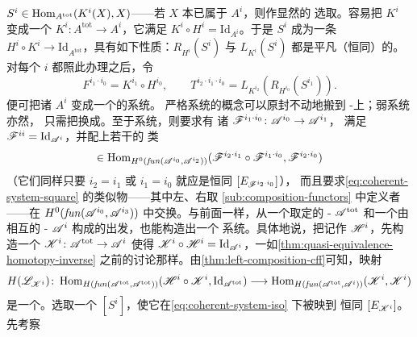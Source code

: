 $S^i\in\operatorname{Hom}_{A^{\mathrm{tot}}}(K^i(X),X)$——若 $X$ 本已属于 $A^i$，则作显然的%
选取。容易把 $K^i$ 变成一个\trFunctor{} $K^i\colon A^{\mathrm{tot}}\to A^i$，它满足%
$K^i\circ H^i=\mathrm{Id}_{A^i}$。于是 $S^i$ 成为一条\trNaturalTransformation{}
$H^i\circ K^i\to\mathrm{Id}_{A^{\mathrm{tot}}}$，具有如下性质：$R_{H^i}(S^i)$ 与%
$L_{K^i}(S^i)$ 都是平凡（恒同）的\trNaturalTransformation。对每个 $i$ 都照此办理之后，令
\begin{equation*}
F^{i_1\cdot i_0}=K^{i_1}\circ H^{i_0},\qquad
T^{i_2\cdot i_1\cdot i_0}=L_{K^{i_2}}(R_{H^{i_0}}(S^{i_1})).
\end{equation*}
便可把诸 $A^i$ 变成一个\trCategory{}的\trCoherent{}系统。
严格系统的概念可以原封不动地搬到 \trAinfty-\trCategory{}上；弱系统亦然，%
只需把\trEquivalence{}换成\trQuasiequivalence。至于\trCoherent{}系统，则要求有%
诸 \trAFunctor{} $\mathscr{F}^{i_1\cdot i_0}\colon \mathscr{A}^{i_0}\to \mathscr{A}^{i_1}$，%
满足 $\mathscr{F}^{ii}=\mathrm{Id}_{\mathscr{A}^i}$，并配上若干\trNaturalTransformation{}的%
\trCohomology{}类
\begin{equation*}
[T^{i_2\cdot i_1\cdot i_0}]\in
\Hom_{H^0(\mathit{fun}(\scr{A}^{i_0},\scr{A}^{i_2}))}
(\scr{F}^{i_2\cdot i_1}\circ\scr{F}^{i_1\cdot i_0},\scr{F}^{i_2\cdot i_0})
\end{equation*}
（它们同样只要 $i_2=i_1$ 或 $i_1=i_0$ 就应是恒同 $[E_{\mathscr{F}^{i_2\cdot i_0}}]$），%
而且要求\eqref{eq:coherent-system-square} 的类似物——其中左、右\trComposition\trFunctor{}取
\cref{sub:composition-functors} 中定义者——在
$H^0(\mathit{fun}(\mathscr{A}^{i_0},\mathscr{A}^{i_3}))$ 中交换。与前面一样，从一个取定的%
\trAinfty-\trCategory{} $\mathscr{A}^{\mathrm{tot}}$ 和一个由相互\trQuasiequivalence{}的%
\trAinfty-\trFullSubcategory{} $\mathscr{A}^i$ 构成的\trFamily{}出发，也能构造出一个%
\trCoherent{}系统。具体地说，把\trEmbedding{}记作 $\mathscr{H}^i$，先构造一个\trQuasiequivalence{}
$\mathscr{K}^i\colon \mathscr{A}^{\mathrm{tot}}\to \mathscr{A}^i$ 使得
$\mathscr{K}^i\circ\mathscr{H}^i=\mathrm{Id}_{\mathscr{A}^i}$，一如\cref{thm:quasi-equivalence-homotopy-inverse}%
之前的讨论那样。由\cref{thm:left-composition-cff}可知，映射
\begin{equation}\label{eq:coherent-system-iso}
H(\mathscr{L}_{\mathscr{K}^i})\colon
\operatorname{Hom}_{H(\mathit{fun}(\mathscr{A}^{\mathrm{tot}},\mathscr{A}^{\mathrm{tot}}))}
(\mathscr{H}^i\circ\mathscr{K}^i,\mathrm{Id}_{\mathscr{A}^{\mathrm{tot}}})
\longrightarrow
\operatorname{Hom}_{H(\mathit{fun}(\mathscr{A}^{\mathrm{tot}},\mathscr{A}^i))}(\mathscr{K}^i,\mathscr{K}^i)
\end{equation}
是一个\trIsomorphism。选取一个 $[S^i]$，使它在\eqref{eq:coherent-system-iso} 下被映到%
恒同\trNaturalTransformation{} $[E_{\mathscr{K}^i}]$。先考察

